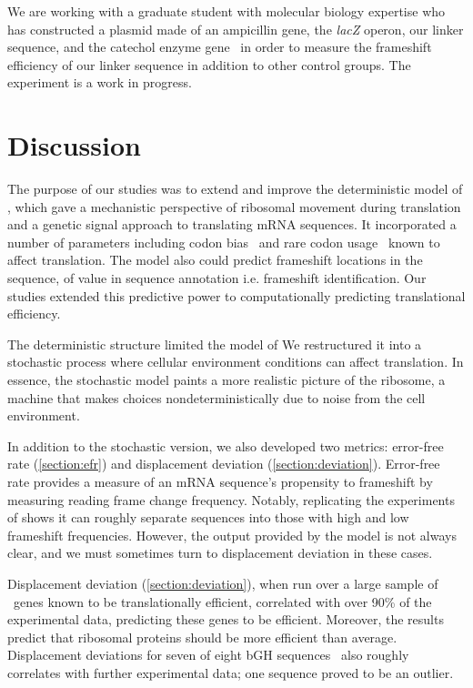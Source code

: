 \documentclass[12pt]{article}
\begin{document}
We are working with a graduate student with molecular biology expertise 
who has constructed a plasmid made of an ampicillin gene, the \emph{lacZ} 
operon, our linker sequence, and the catechol enzyme gene \xylE\ in order 
to measure the frameshift efficiency of our linker sequence in addition 
to other control groups. The experiment is a work in progress.

\section{Discussion}
\label{section:discussion}

The purpose of our studies was to extend and improve the deterministic
model of \citeauthor{lalit:mechanics}, which gave a mechanistic
perspective of ribosomal movement during translation and a genetic
signal approach to translating mRNA sequences. It incorporated a
number of parameters including
codon bias~\cite{ikemura} and rare codon usage~\cite{kane95} known to
affect translation. The model also could predict frameshift locations
in the sequence, of value in sequence annotation i.e. frameshift identification.
Our studies extended this predictive power to 
computationally predicting translational efficiency.

The deterministic structure limited the model of \citeauthor{lalit:mechanics}
We restructured it into a stochastic process where cellular
environment conditions can affect translation. In essence, the
stochastic model paints a more realistic picture of the ribosome, a
machine that makes choices nondeterministically due to noise from the
cell environment.

In addition to the stochastic version, we also developed two metrics:
error-free rate (\autoref{section:efr}) and displacement deviation
(\autoref{section:deviation}). Error-free rate
provides a measure of an mRNA sequence's propensity to frameshift by
measuring reading frame change frequency.  Notably, replicating the experiments
of \citet{weiss87} shows it can roughly separate sequences into
those with high and low frameshift frequencies. However, the
output provided by the model is not always clear, and we must sometimes turn to
displacement deviation in these cases.

Displacement deviation (\autoref{section:deviation}),
when run over a large sample of \ecoli\ genes known to be translationally efficient,
correlated with over 90\% of the  experimental data, predicting
these genes to be efficient.  Moreover, the results predict that ribosomal proteins should
be more efficient than average.  Displacement deviations for seven of eight bGH
sequences~\cite{schoner:bgh} also roughly correlates with further
experimental data; one sequence proved to be an outlier.
\end{document}

